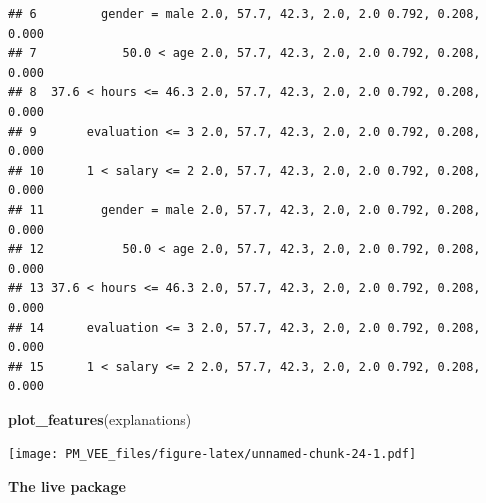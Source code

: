 \documentclass[]{book}
\newenvironment{Shaded}{\begin{snugshade}}{\end{snugshade}}
\newcommand{\KeywordTok}[1]{\textcolor[rgb]{0.13,0.29,0.53}{\textbf{#1}}}
\newcommand{\NormalTok}[1]{#1}
\theoremstyle{definition}
\theoremstyle{definition}
\theoremstyle{definition}
\theoremstyle{remark}
\begin{document}
\begin{verbatim}
## 6         gender = male 2.0, 57.7, 42.3, 2.0, 2.0 0.792, 0.208, 0.000
## 7            50.0 < age 2.0, 57.7, 42.3, 2.0, 2.0 0.792, 0.208, 0.000
## 8  37.6 < hours <= 46.3 2.0, 57.7, 42.3, 2.0, 2.0 0.792, 0.208, 0.000
## 9       evaluation <= 3 2.0, 57.7, 42.3, 2.0, 2.0 0.792, 0.208, 0.000
## 10      1 < salary <= 2 2.0, 57.7, 42.3, 2.0, 2.0 0.792, 0.208, 0.000
## 11        gender = male 2.0, 57.7, 42.3, 2.0, 2.0 0.792, 0.208, 0.000
## 12           50.0 < age 2.0, 57.7, 42.3, 2.0, 2.0 0.792, 0.208, 0.000
## 13 37.6 < hours <= 46.3 2.0, 57.7, 42.3, 2.0, 2.0 0.792, 0.208, 0.000
## 14      evaluation <= 3 2.0, 57.7, 42.3, 2.0, 2.0 0.792, 0.208, 0.000
## 15      1 < salary <= 2 2.0, 57.7, 42.3, 2.0, 2.0 0.792, 0.208, 0.000
\end{verbatim}

\begin{Shaded}
\begin{Highlighting}[]
\KeywordTok{plot_features}\NormalTok{(explanations)}
\end{Highlighting}
\end{Shaded}

\texttt{[image: PM\_VEE\_files/figure-latex/unnamed-chunk-24-1.pdf]}

\textbf{The live package}
\end{document}
